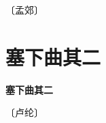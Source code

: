 \documentclass[12pt,UTF-8,openany,fontset=none]{ctexbook}
\begin{document}
\begin{center}
    \vspace{10pt}
    
    \begin{large}
        
        〔孟郊〕
        
    \end{large}
    
    \vspace{8pt}
    
    \begin{huge}
        
        \phantom{。}

        \phantom{。}
        
        \phantom{。}

        \phantom{。}
        
        \phantom{。}

        \phantom{。}
        
    \end{huge}
    
\end{center}

\vspace{8pt}
\clearpage


\section{塞下曲其二}



\begin{center}
    {\bfseries 塞下曲其二}
\end{center}

\begin{center}
    \vspace{10pt}
    
    \begin{large}
        
        〔卢纶〕
        
    \end{large}
    
    \vspace{8pt}
    
    \begin{huge}
        
        \phantom{。}

        \phantom{。}
        
        \phantom{。}

        \phantom{。}
        
    \end{huge}
    
\end{center}
\end{document}
